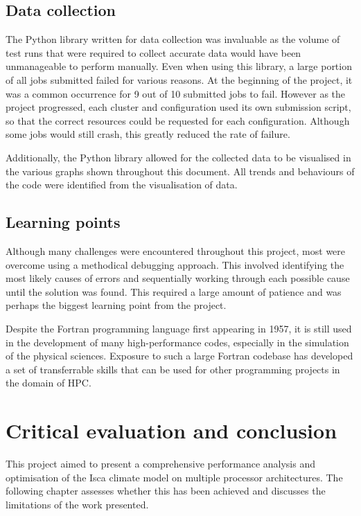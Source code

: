 \documentclass[a4paper,11pt]{report}
\begin{document}
\section{Data collection}
The Python library written for data collection was invaluable as the volume of test runs that were required to collect accurate data would have been unmanageable to perform manually. Even when using this library, a large portion of all jobs submitted failed for various reasons. At the beginning of the project, it was a common occurrence for 9 out of 10 submitted jobs to fail. However as the project progressed, each cluster and configuration used its own submission script, so that the correct resources could be requested for each configuration. Although some jobs would still crash, this greatly reduced the rate of failure.
\par
Additionally, the Python library allowed for the collected data to be visualised in the various graphs shown throughout this document. All trends and behaviours of the code were identified from the visualisation of data. 

\section{Learning points}
Although many challenges were encountered throughout this project, most were overcome using a methodical debugging approach. This involved identifying the most likely causes of errors and sequentially working through each possible cause until the solution was found. This required a large amount of patience and was perhaps the biggest learning point from the project.
\par
Despite the Fortran programming language first appearing in 1957, it is still used in the development of many high-performance codes, especially in the simulation of the physical sciences. Exposure to such a large Fortran codebase has developed a set of transferrable skills that can be used for other programming projects in the domain of HPC. 


\chapter{Critical evaluation and conclusion}
This project aimed to present a comprehensive performance analysis and optimisation of the Isca climate model on multiple processor architectures. The following chapter assesses whether this has been achieved and discusses the limitations of the work presented. 
\par
\end{document}
